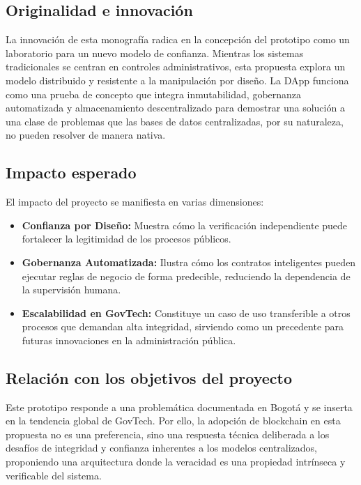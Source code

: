 \subsection{Originalidad e innovación}
La innovación de esta monografía radica en la concepción del prototipo como un laboratorio para un nuevo modelo de confianza. Mientras los sistemas tradicionales se centran en controles administrativos, esta propuesta explora un modelo distribuido y resistente a la manipulación por diseño. La DApp funciona como una prueba de concepto que integra inmutabilidad, gobernanza automatizada y almacenamiento descentralizado para demostrar una solución a una clase de problemas que las bases de datos centralizadas, por su naturaleza, no pueden resolver de manera nativa.

\subsection{Impacto esperado}
El impacto del proyecto se manifiesta en varias dimensiones:
\begin{itemize}
\item \textbf{Confianza por Diseño:} Muestra cómo la verificación independiente puede fortalecer la legitimidad de los procesos públicos.
\item \textbf{Gobernanza Automatizada:} Ilustra cómo los contratos inteligentes pueden ejecutar reglas de negocio de forma predecible, reduciendo la dependencia de la supervisión humana.
\item \textbf{Escalabilidad en GovTech:} Constituye un caso de uso transferible a otros procesos que demandan alta integridad, sirviendo como un precedente para futuras innovaciones en la administración pública.
\end{itemize}

\subsection{Relación con los objetivos del proyecto} 
Este prototipo responde a una problemática documentada en Bogotá y se inserta en la tendencia global de GovTech. Por ello, la adopción de blockchain en esta propuesta no es una preferencia, sino una respuesta técnica deliberada a los desafíos de integridad y confianza inherentes a los modelos centralizados, proponiendo una arquitectura donde la veracidad es una propiedad intrínseca y verificable del sistema. 